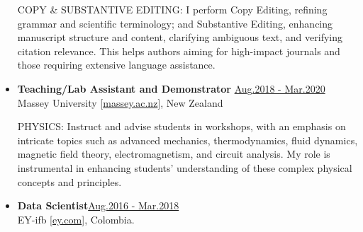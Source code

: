 \begin{itemize}
          {\noindent
              \uppercase{Copy \& Substantive Editing:}
              I perform Copy Editing, refining grammar and scientific terminology; and Substantive Editing, enhancing manuscript structure and content, clarifying ambiguous text, and verifying citation relevance. This helps authors aiming for high-impact journals and those requiring extensive language assistance. %
          }

    \item \textbf{\large Teaching/Lab Assistant and Demonstrator} \hfill \href{.}{Aug.2018 - Mar.2020}\\
          Massey University [\href{www.massey.ac.nz}{massey.ac.nz}],
          New Zealand

              {\noindent
                  \uppercase{Physics:}
                  Instruct and advise students in workshops, with an emphasis on intricate topics such as advanced mechanics, thermodynamics, fluid dynamics, magnetic field theory, electromagnetism, and circuit analysis. My role is instrumental in enhancing students' understanding of these complex physical concepts and principles.
              }




    \item \textbf{\large Data Scientist}\hfill \href{.}{Aug.2016 - Mar.2018}\\
          EY-ifb [\href{www.ey.com/en\_gl/ey-ifb}{ey.com}],
          Colombia.


\end{itemize}
